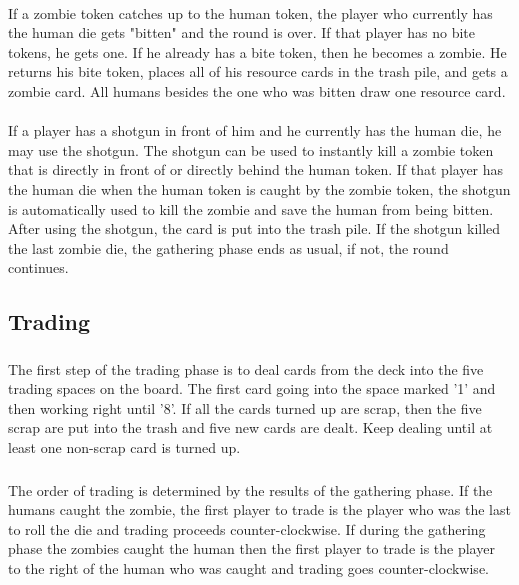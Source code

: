 \documentclass[12pt]{article} %
\begin{document}
\paragraph{}
If a zombie token catches up to the human token, the player who currently has the human die gets "bitten" and the round is over.  If that player has no bite tokens, he gets one.  If he already has a bite token, then he becomes a zombie.  He returns his bite token, places all of his resource cards in the trash pile, and gets a zombie card.  All humans besides the one who was bitten draw one resource card. \newline 

\paragraph{}
If a player has a shotgun in front of him and he currently has the human die, he may use the shotgun.  The shotgun can be used to instantly kill a zombie token that is directly in front of or directly behind the human token.  If that player has the human die when the human token is caught by the zombie token, the shotgun is automatically used to kill the zombie and save the human from being bitten.  After using the shotgun, the card is put into the trash pile.  If the shotgun killed the last zombie die, the gathering phase ends as usual, if not, the round continues.

\subsection{Trading}

\subsubsection{}
The first step of the trading phase is to deal cards from the deck into the five trading spaces on the board.  The first card going into the space marked '1' and then working right until '8'.  If all the cards turned up are scrap, then the five scrap are put into the trash and five new cards are dealt.  Keep dealing until at least one non-scrap card is turned up.

\subsubsection{}
The order of trading is determined by the results of the gathering phase.  If the humans caught the zombie, the first player to trade is the player who was the last to roll the die and trading proceeds counter-clockwise.  If during the gathering phase the zombies caught the human then the first player to trade is the player to the right of the human who was caught and trading goes counter-clockwise.  
\end{document}

